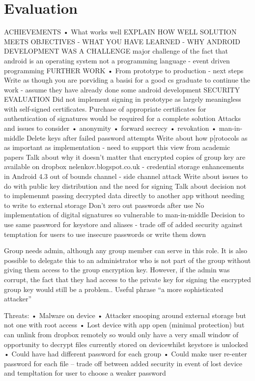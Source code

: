 
\chapter{Evaluation}
\label{cha:evaluation}

ACHIEVEMENTS
• What works well
EXPLAIN HOW WELL SOLUTION MEETS OBJECTIVES -
WHAT YOU HAVE LEARNED - WHY ANDROID DEVELOPMENT WAS A CHALLENGE
major challenge of the fact that android is an operating system not a programming language - event driven programming
FURTHER WORK
• From prototype to production - next steps
Write as though you are porviding a basisi for a good cs graduate to continue the work - assume they have already done some android development
SECURITY EVALUATION
Did not implement signing in prototype as largely meaningless with self-signed certificates. Purchase of appropriate certificates for authentication of signatures would be required for a complete solution
Attacks and issues to consider
• anonymity
• forward secrecy
• revokation
• man-in-middle
Delete keys after failed password attempts
Write about how p[rotocols as as important as implementation - need to support this view from academic papers
Talk about why it doesn't matter that encrypted copies of group key are available on dropbox
nelenkov.blogspot.co.uk - credential storage enhancements in Android 4.3
out of bounds channel - side channel attack
Write about issues to do with public key distribution and the need for signing
Talk about decision not to implemenmt passing decrypted data directly to another app without needing to write to external storage
Don't zero out passwords after use
No implementation of digital signatures so vulnerable to man-in-middle
Decision to use same password for keystore and aliases - trade off of added security against temptation for users to use insecure passwords or write them down




Group needs admin, although any group member can serve in this role.  It is also possible to delegate this to an administrator who is not part of the group without giving them access to the group encryption key.  However, if the admin was corrupt, the fact that they had access to the private key for signing the encrypted group key would still be a problem.. Useful phrase “a more sophisticated attacker”

Threats:
•	Malware on device
•	Attacker snooping around external storage but not one with root access
•	Lost device with app open (minimal protection) but can unlink from dropbox remotely so would only have a very small window of opportunity to decrypt files currently stored on devicewhilst keystore is unlocked
•	Could have had different password for each group
•	Could make user re-enter password for each file – trade off between added security in event of lost device and templtation for user to choose a weaker password

